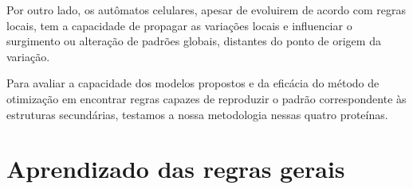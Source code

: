 Por outro lado, os autômatos celulares, apesar de evoluirem de acordo com regras locais, tem a capacidade de propagar as variações locais e influenciar o surgimento ou alteração de padrões globais, distantes do ponto de origem da variação. 

Para avaliar a capacidade dos modelos propostos e da eficácia do método de otimização em encontrar regras capazes de reproduzir o padrão correspondente às estruturas secundárias, testamos a nossa metodologia nessas quatro proteínas.



\chapter{Aprendizado das regras gerais}





